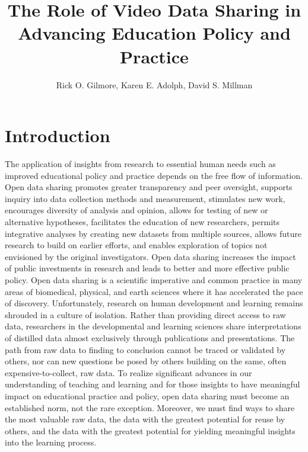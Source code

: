 \documentclass[letterpaper,man,natbib]{apa6}
\title{The Role of Video Data Sharing in Advancing Education Policy and Practice}
\author{Rick O. Gilmore, Karen E. Adolph, David S. Millman}
\affiliation{The Databrary (databrary.org) Project}
\begin{document}
\maketitle

\section{Introduction}

The application of insights from research to essential human needs such as improved educational policy and practice depends on the free flow of information. 
Open data sharing promotes greater transparency and peer oversight, supports inquiry into data collection methods and measurement, stimulates new work, encourages diversity of analysis and opinion, allows for testing of new or alternative hypotheses, facilitates the education of new researchers, permits integrative analyses by creating new datasets from multiple sources, allows future research to build on earlier efforts, and enables exploration of topics not envisioned by the original investigators. 
Open data sharing increases the impact of public investments in research and leads to better and more effective public policy.
Open data sharing is a scientific imperative and common practice in many areas of biomedical, physical, and earth sciences where it has accelerated the pace of discovery. 
Unfortunately, research on human development and learning remains shrouded in a culture of isolation. 
Rather than providing direct access to raw data, researchers in the developmental and learning sciences share interpretations of distilled data almost exclusively through publications and presentations.
The path from raw data to finding to conclusion cannot be traced or validated by others, nor can new questions be posed by others building on the same, often expensive-to-collect, raw data.
To realize significant advances in our understanding of teaching and learning and for those insights to have meaningful impact on educational practice and policy, open data sharing must become an established norm, not the rare exception.
Moreover, we must find ways to share the most valuable raw data, the data with the greatest potential for reuse by others, and the data with the greatest potential for yielding meaningful insights into the learning process.
\end{document}
